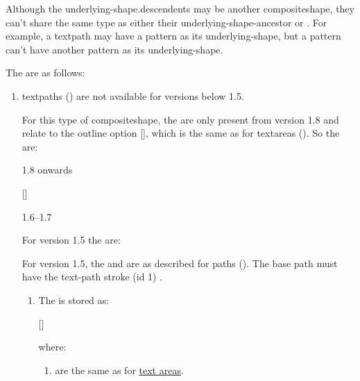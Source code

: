 \begin{numbered}
Although the \glspl{underlying-shape.descendent} may be another
\gls*{compositeshape}, they can't share the same type as either
their \gls{underlying-shape-ancestor} or
. For example, a
\gls{textpath} may have a \gls{pattern} as its \gls{underlying-shape}, but
a pattern can't have another pattern as its \gls{underlying-shape}.

The  are as follows:

  \begin{enumerate}%
  \item\label{jdr:textpath}%
  \Glspl{textpath} () are not available for versions below 1.5.

  For this type of \gls{compositeshape}, the  are only
  present from version 1.8 and relate to the outline option
   [], which is
  the same as for \glspl*{textarea} (\hyperref[jdr:textarea]{}). So the
   are:
  \begin{jdrversion}{1.8 onwards}
  \begin{syntaxline}
   [] 
  \end{syntaxline}
  \end{jdrversion}
  \begin{jdrversion}{1.6--1.7}
  \begin{syntaxline}
  \end{syntaxline}
  \end{jdrversion}

  For version 1.5 the  are:
  \begin{jdrversion}{1.5}
  \begin{syntaxline}
    
  \end{syntaxline}
  For version 1.5, the  and  are as described
  for paths (\hyperref[jdr:path]{}). The base path must have the
  text-path stroke (id 1) \hyperref[jdr:pathstyle]{}.
  \end{jdrversion}

    \begin{enumerate}%

    \item\label{jdr:textpathstroke} The  is
    stored as:
    \begin{syntaxline}
      
    [] 
    \end{syntaxline}
    where:
      \begin{enumerate}
      \item {} are the same as for
      \hyperref[jdr:textarea]{text areas}.


\end{enumerate}
\end{enumerate}
\end{enumerate}
\end{numbered}

